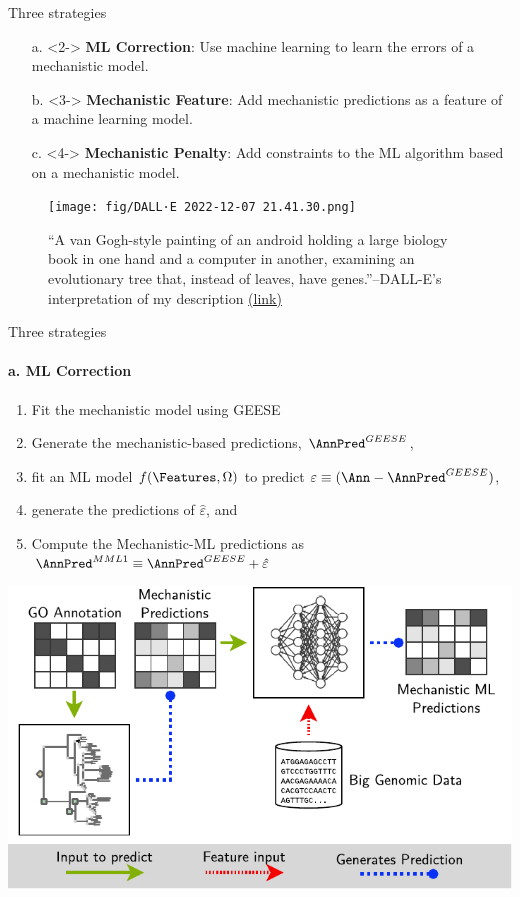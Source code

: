 \documentclass[10pt,aspectratio=169]{beamer}
\newcounter{frame}[frame]
\begin{document}
\begin{frame}{Three strategies}
	
	\begin{itemize}
	\item[a.]<2-> \textbf{ML Correction}: Use machine learning to learn the errors of a mechanistic model.
	\item[b.]<3-> \textbf{Mechanistic Feature}: Add mechanistic predictions as a feature of a machine learning model.
	\item[c.]<4-> \textbf{Mechanistic Penalty}: Add constraints to the ML algorithm based on a mechanistic model.
	\end{itemize}

	\begin{figure}
	\centering
	\texttt{[image: fig/DALL·E 2022-12-07 21.41.30.png]}
	\caption{``A van Gogh-style painting of an android holding a large biology book in one hand and a computer in another, examining an evolutionary tree that, instead of leaves, have genes.''--DALL-E's interpretation of my description \hyperlink{https://labs.openai.com/s/s0GoDQ64OMRfMr1y6uRXtmo9}{(link)}}
\end{figure}
\end{frame}

\begin{frame}{Three strategies}
	\framesubtitle{a. ML Correction}
	\begin{minipage}[b]{.4\linewidth}
		\begin{enumerate}[<+->]
			\item Fit the mechanistic model using GEESE
			\item Generate the mechanistic-based predictions, $\AnnPred^{GEESE}$, 
			\item fit an ML model $f(\Features, \Omega)$ to predict $\varepsilon \equiv (\Ann - \AnnPred^{GEESE})$, \item generate the predictions of $\hat\varepsilon$, and 
			\item Compute the Mechanistic-ML predictions as $\AnnPred^{MML1} \equiv \AnnPred^{GEESE} + \hat\varepsilon$
		\end{enumerate}
	\end{minipage}\hfill%
	\begin{minipage}[b]{.55\linewidth}
	\includegraphics[width=1\linewidth]{fig/mech-ml-model-a.pdf}
	\end{minipage}
\end{frame}
\end{document}
